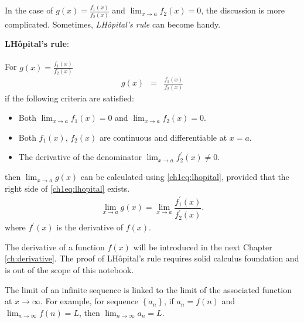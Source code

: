 In the case of $g(x)=\frac{f_1(x)}{f_2(x)}$ and $\lim_{x \rightarrow a}f_2(x) = 0$, the discussion is more complicated. Sometimes, \textit{L\textprime H\^opital's rule} can become handy. 

\begin{VF}
\textbf{L\textprime H\^opital's rule}:
\\
\\
\noindent For $g(x)=\frac{f_1(x)}{f_2(x)}$
\begin{eqnarray}
  g(x) &=& \frac{f_1(x)}{f_2(x)} \nonumber
\end{eqnarray}
if the following criteria are satisfied:
\begin{itemize}
  \item Both $\lim_{x\rightarrow a}f_1(x) = 0$ and $\lim_{x\rightarrow a}f_2(x) = 0$.
  \item Both $f_1(x)$, $f_2(x)$ are continuous and differentiable at $x=a$.
  \item The derivative of the denominator $\lim_{x\rightarrow a}f_2^\prime(x) \neq 0$.
\end{itemize}
then $\lim_{x\rightarrow a}g(x)$ can be calculated using \eqref{ch1eq:lhopital}, provided that the right side of \eqref{ch1eq:lhopital} exists.
\begin{eqnarray}
  \lim_{x\rightarrow a}g(x) = \lim_{x\rightarrow a} \dfrac{f_1^\prime(x)}{f_2^\prime(x)}. \label{ch1eq:lhopital}
\end{eqnarray}
where $f^\prime(x)$ is the derivative of $f(x)$.
\end{VF}

The derivative of a function $f(x)$ will be introduced in the next Chapter \ref{ch:derivative}. The proof of L\textprime H\^opital's rule requires solid calculus foundation and is out of the scope of this notebook.

The limit of an infinite sequence is linked to the limit of the associated function at $x\rightarrow\infty$. For example, for sequence $\left\{a_n\right\}$, if $a_n=f(n)$ and $\lim_{n\rightarrow\infty}f(n)=L$, then $\lim_{n\rightarrow\infty}a_n=L$.
